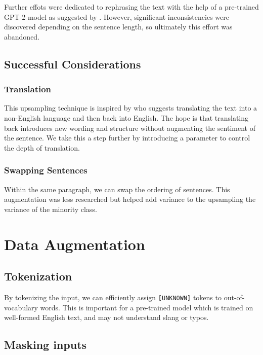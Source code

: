 \documentclass[11pt,a4paper]{article}
\begin{document}
Further effots were dedicated to rephrasing the text with the help of a pre-trained GPT-2 model as suggested by \citet{Dai2023AugGPTLC}. However, significant inconsistencies were discovered depending on the sentence length, so ultimately this effort was abandoned.

\subsection{Successful Considerations}

\subsubsection{Translation}\label{sect:translation}

This upsampling technique is inspired by \citet{nlp-imbalanced-data} who suggests translating the text into a non-English language and then back into English. The hope is that translating back introduces new wording and structure without augmenting the sentiment of the sentence. We take this a step further by introducing a parameter to control the depth of translation.

\subsubsection{Swapping Sentences}

Within the same paragraph, we can swap the ordering of sentences. This augmentation was less researched but helped add variance to the upsampling the variance of the minority class.

\section{Data Augmentation}

\subsection{Tokenization}

By tokenizing the input, we can efficiently assign \texttt{[UNKNOWN]} tokens to out-of-vocabulary words. This is important for a pre-trained model which is trained on well-formed English text, and may not understand slang or typos.

\subsection{Masking inputs}
\end{document}
